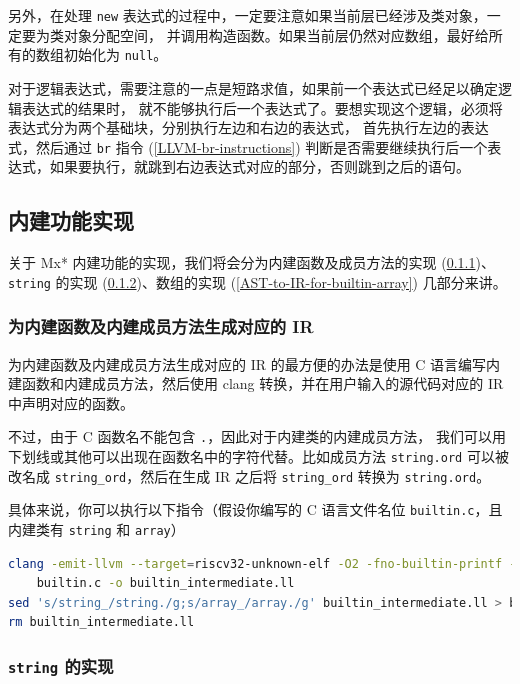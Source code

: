 另外，在处理 \texttt{new} 表达式的过程中，一定要注意如果当前层已经涉及类对象，一定要为类对象分配空间，
并调用构造函数。如果当前层仍然对应数组，最好给所有的数组初始化为
\texttt{null}。

对于逻辑表达式，需要注意的一点是短路求值，如果前一个表达式已经足以确定逻辑表达式的结果时，
就不能够执行后一个表达式了。要想实现这个逻辑，必须将表达式分为两个基础块，分别执行左边和右边的表达式，
首先执行左边的表达式，然后通过 \texttt{br} 指令 (\ref{LLVM-br-instructions})
判断是否需要继续执行后一个表达式，如果要执行，就跳到右边表达式对应的部分，否则跳到之后的语句。

\subsection{内建功能实现}\label{AST-to-IR-for-builtin}

关于 Mx* 内建功能的实现，我们将会分为内建函数及成员方法的实现
(\ref{AST-to-IR-for-builtin-func})、\texttt{string} 的实现
(\ref{AST-to-IR-for-builtin-string})、数组的实现
(\ref{AST-to-IR-for-builtin-array}) 几部分来讲。

\subsubsection{为内建函数及内建成员方法生成对应的 IR}\label{AST-to-IR-for-builtin-func}

为内建函数及内建成员方法生成对应的 IR 的最方便的办法是使用 C
语言编写内建函数和内建成员方法，然后使用 clang 转换，并在用户输入的源代码对应的 IR 中声明对应的函数。

不过，由于 C 函数名不能包含 \texttt{.}，因此对于内建类的内建成员方法，
我们可以用下划线或其他可以出现在函数名中的字符代替。比如成员方法 \texttt{string.ord}
可以被改名成 \texttt{string\_ord}，然后在生成 IR 之后将
\texttt{string\_ord} 转换为 \texttt{string.ord}。

具体来说，你可以执行以下指令（假设你编写的 C 语言文件名位 \texttt{builtin.c}，且内建类有
\texttt{string} 和 \texttt{array}）
\begin{lstlisting}[language=sh]
clang -emit-llvm --target=riscv32-unknown-elf -O2 -fno-builtin-printf -fno-builtin-memcpy \
    builtin.c -o builtin_intermediate.ll
sed 's/string_/string./g;s/array_/array./g' builtin_intermediate.ll > builtin.ll
rm builtin_intermediate.ll
\end{lstlisting}

\subsubsection{\texttt{string} 的实现}\label{AST-to-IR-for-builtin-string}

